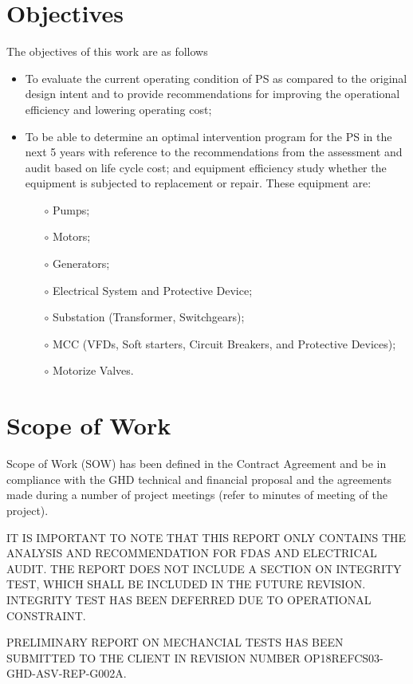 \section{Objectives}
The objectives of this work are as follows
\begin{itemize}
	\item To evaluate the current operating condition of PS as compared to the original design intent and to provide recommendations for improving the operational efficiency and lowering operating cost;
	\item To be able to determine an optimal intervention program for the PS in the next 5 years with reference to the recommendations from the assessment and audit based on life cycle cost; and equipment efficiency study whether the equipment is subjected to replacement or repair. These equipment are:
	\begin{itemize}
		\item[$\circ$] Pumps;
		\item[$\circ$] Motors;
		\item[$\circ$] Generators;
		\item[$\circ$] Electrical System and Protective Device;
		\item[$\circ$] Substation (Transformer, Switchgears);
		\item[$\circ$] MCC (VFDs, Soft starters, Circuit Breakers, and Protective Devices);
		\item[$\circ$] Motorize Valves.	
	\end{itemize}
\end{itemize}

\section{Scope of Work}
Scope of Work (SOW) has been defined in the Contract Agreement and be in compliance with the GHD technical and financial proposal and the agreements made during a number of project meetings (refer to minutes of meeting of the project). 

{\color{red}
IT IS IMPORTANT TO NOTE THAT THIS REPORT ONLY CONTAINS THE ANALYSIS AND RECOMMENDATION FOR FDAS AND ELECTRICAL AUDIT. THE REPORT DOES NOT INCLUDE A SECTION ON INTEGRITY TEST, WHICH SHALL BE INCLUDED IN THE FUTURE REVISION. INTEGRITY TEST HAS BEEN DEFERRED DUE TO OPERATIONAL CONSTRAINT. 

PRELIMINARY REPORT ON MECHANCIAL TESTS HAS BEEN SUBMITTED TO THE CLIENT IN REVISION NUMBER OP18REFCS03-GHD-ASV-REP-G002A.
}


